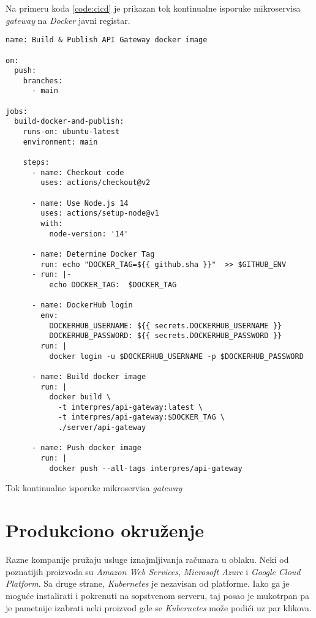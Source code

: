 Na primeru koda \ref{code:cicd} je prikazan tok kontinualne isporuke
mikroservisa \textit{gateway} na \textit{Docker} javni registar.

\begin{listing}[h]
  \centering
  \begin{verbatim}
name: Build & Publish API Gateway docker image

on:
  push:
    branches:
      - main

jobs:
  build-docker-and-publish:
    runs-on: ubuntu-latest
    environment: main

    steps:
      - name: Checkout code
        uses: actions/checkout@v2

      - name: Use Node.js 14
        uses: actions/setup-node@v1
        with:
          node-version: '14'

      - name: Determine Docker Tag
        run: echo "DOCKER_TAG=${{ github.sha }}"  >> $GITHUB_ENV
      - run: |-
          echo DOCKER_TAG:  $DOCKER_TAG

      - name: DockerHub login
        env:
          DOCKERHUB_USERNAME: ${{ secrets.DOCKERHUB_USERNAME }}
          DOCKERHUB_PASSWORD: ${{ secrets.DOCKERHUB_PASSWORD }}
        run: |
          docker login -u $DOCKERHUB_USERNAME -p $DOCKERHUB_PASSWORD

      - name: Build docker image
        run: |
          docker build \
            -t interpres/api-gateway:latest \
            -t interpres/api-gateway:$DOCKER_TAG \
            ./server/api-gateway

      - name: Push docker image
        run: |
          docker push --all-tags interpres/api-gateway
\end{verbatim}
\caption{Tok kontinualne isporuke mikroservisa \textit{gateway}}
\label{code:cicd}
\end{listing}

\section{Produkciono okruženje}
Razne kompanije pružaju usluge iznajmljivanja računara u oblaku. Neki od 
poznatijih proizvoda su \textit{Amazon Web Services}, \textit{Microsoft Azure}
i \textit{Google Cloud Platform}. Sa druge strane, \textit{Kubernetes} je 
nezavisan od platforme. Iako ga je moguće instalirati i pokrenuti na sopstvenom 
serveru, taj posao je mukotrpan pa je pametnije izabrati neki proizvod gde se 
\textit{Kubernetes} može podići uz par klikova. 

